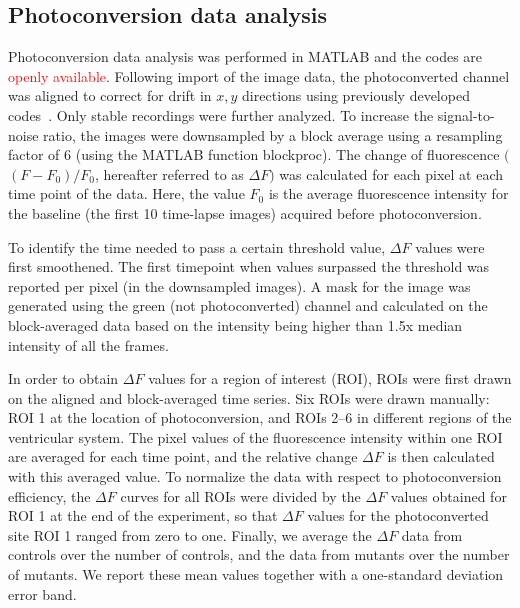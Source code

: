 \documentclass[fleqn]{wlscirep}
\newcommand{\fixme}[1]{\textcolor{red}{#1}}
\begin{document}
\subsection*{Photoconversion data analysis}

Photoconversion data analysis was performed in MATLAB and the codes are \fixme{openly available\cite{zenodo-archive-for-repo-link-fixme}}. Following import of the image data, the photoconverted channel was aligned to correct for drift in $x,y$ directions using previously developed codes~\cite{Reiten2017Motile-Cilia-MediatedComputations, Ringers2023NovelEpithelia}. Only stable recordings were further analyzed. To increase the signal-to-noise ratio, the images were downsampled by a block average using a resampling factor of 6 (using the MATLAB function blockproc). The change of fluorescence $($$(F-F_0)/F_0$, hereafter referred to as $\Delta F$$)$ was calculated for each pixel at each time point of the data. Here, the value $F_0$ is the average fluorescence intensity for the baseline (the first 10 time-lapse images) acquired before photoconversion. 

To identify the time needed to pass a certain threshold value, $\Delta F$ values were first smoothened. The first timepoint when values surpassed the threshold was reported per pixel (in the downsampled images). A mask for the image was generated using the green (not photoconverted) channel and calculated on the block-averaged data based on the intensity being higher than 1.5x median intensity of all the frames.

In order to obtain $\Delta F$ values for a region of interest (ROI), ROIs were first drawn on the aligned and block-averaged time series. Six ROIs were drawn manually: ROI 1 at the location of photoconversion, and ROIs 2--6 in different regions of the ventricular system. The pixel values of the fluorescence intensity within one ROI are averaged for each time point, and the relative change $\Delta F$ is then calculated with this averaged value. To normalize the data with respect to photoconversion efficiency, the $\Delta F$ curves for all ROIs were divided by the $\Delta F$ values obtained for ROI 1 at the end of the experiment, so that $\Delta F$ values for the photoconverted site ROI 1 ranged from zero to one. Finally, we average the $\Delta F$ data from controls over the number of controls, and the data from mutants over the number of mutants. We report these mean values together with a one-standard deviation error band.
\end{document}
